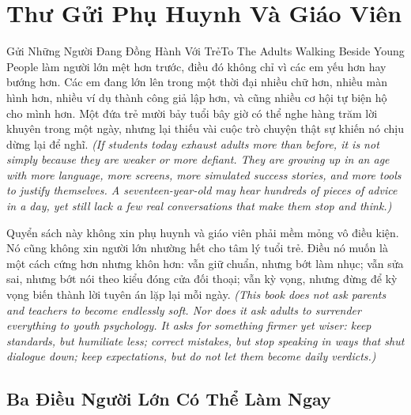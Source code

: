 \chapter*{Thư Gửi Phụ Huynh Và Giáo Viên}

\begin{truyen}{Gửi Những Người Đang Đồng Hành Với Trẻ}{To The Adults Walking Beside Young People}
 làm người lớn mệt hơn trước, điều đó không chỉ vì các em yếu hơn hay bướng hơn. Các em đang lớn lên trong một thời đại nhiều chữ hơn, nhiều màn hình hơn, nhiều ví dụ thành công giả lập hơn, và cũng nhiều cơ hội tự biện hộ cho mình hơn. Một đứa trẻ mười bảy tuổi bây giờ có thể nghe hàng trăm lời khuyên trong một ngày, nhưng lại thiếu vài cuộc trò chuyện thật sự khiến nó chịu dừng lại để nghĩ.
\textit{(If students today exhaust adults more than before, it is not simply because they are weaker or more defiant. They are growing up in an age with more language, more screens, more simulated success stories, and more tools to justify themselves. A seventeen-year-old may hear hundreds of pieces of advice in a day, yet still lack a few real conversations that make them stop and think.)}

Quyển sách này không xin phụ huynh và giáo viên phải mềm mỏng vô điều kiện. Nó cũng không xin người lớn nhường hết cho tâm lý tuổi trẻ. Điều nó muốn là một cách cứng hơn nhưng khôn hơn: vẫn giữ chuẩn, nhưng bớt làm nhục; vẫn sửa sai, nhưng bớt nói theo kiểu đóng cửa đối thoại; vẫn kỳ vọng, nhưng đừng để kỳ vọng biến thành lời tuyên án lặp lại mỗi ngày.
\textit{(This book does not ask parents and teachers to become endlessly soft. Nor does it ask adults to surrender everything to youth psychology. It asks for something firmer yet wiser: keep standards, but humiliate less; correct mistakes, but stop speaking in ways that shut dialogue down; keep expectations, but do not let them become daily verdicts.)}
\end{truyen}

\section*{Ba Điều Người Lớn Có Thể Làm Ngay}

